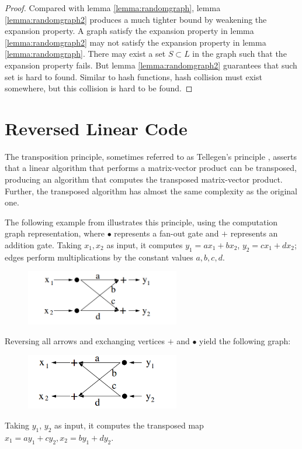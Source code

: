 \begin{proof}
Compared with lemma \ref{lemma:randomgraph}, lemma \ref{lemma:randomgraph2} produces a much tighter bound by weakening the expansion property. A graph satisfy the expansion property in lemma \ref{lemma:randomgraph2} may not satisfy the expansion property in lemma \ref{lemma:randomgraph}. There may exist a set $S \subset L$ in the graph such that the expansion property fails. But lemma \ref{lemma:randomgraph2} guarantees that such set is hard to found. Similar to hash functions, hash collision must exist somewhere, but this collision is hard to be found.

\end{proof}

\section{Reversed Linear Code}

The transposition principle, sometimes referred to as Tellegen’s principle \cite{Tellegen}, asserts that a linear algorithm that performs a matrix-vector product can be transposed, producing an algorithm that computes the transposed matrix-vector product. Further, the transposed algorithm has almost the same complexity as the original one.

The following example from \cite{Tellegen} illustrates this principle, using the
computation graph representation, where $\bullet$ represents a fan-out gate and $+$ represents an addition gate. Taking $x_1, x_2$ as input, it computes $y_1 = ax_1 + bx_2$, $y_2 = cx_1 + dx_2$; edges perform multiplications by the constant values $a, b, c, d$.

\begin{figure}[h]
    \centering
    \includegraphics[width=0.6\textwidth]{graph/t1.png}
\end{figure}

Reversing all arrows and exchanging vertices $+$ and $\bullet$ yield the following graph:

\begin{figure}[h]
    \centering
    \includegraphics[width=0.6\textwidth]{graph/t2.png}
\end{figure}
Taking $y_1$, $y_2$ as input, it computes the transposed map $x_1 = ay_1 + cy_2, x_2 = by_1 + dy_2$.

